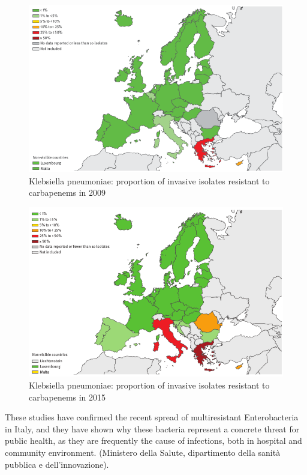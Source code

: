 \documentclass[11pt]{report}
\begin{document}
\begin{figure}[htp]
\centering
\includegraphics[scale=0.60]{immagini gamalero/K.pneu_2009.png}
\caption{Klebsiella pneumoniae: proportion of invasive isolates resistant to carbapenems in 2009}
\label{}
\end{figure}

\clearpage
\begin{figure}[htp]
\centering
\includegraphics[scale=0.60]{immagini gamalero/K.pneu_2015.png}
\caption{Klebsiella pneumoniae: proportion of invasive isolates resistant to carbapenems in 2015}
\label{}
\end{figure}

These studies have confirmed the recent spread of multiresistant Enterobacteria in Italy, and they have shown why these bacteria represent a concrete threat for public health, as they are frequently the cause of infections, both in hospital and community environment.
(Ministero della Salute, dipartimento della sanità pubblica e dell’innovazione).
\end{document}
